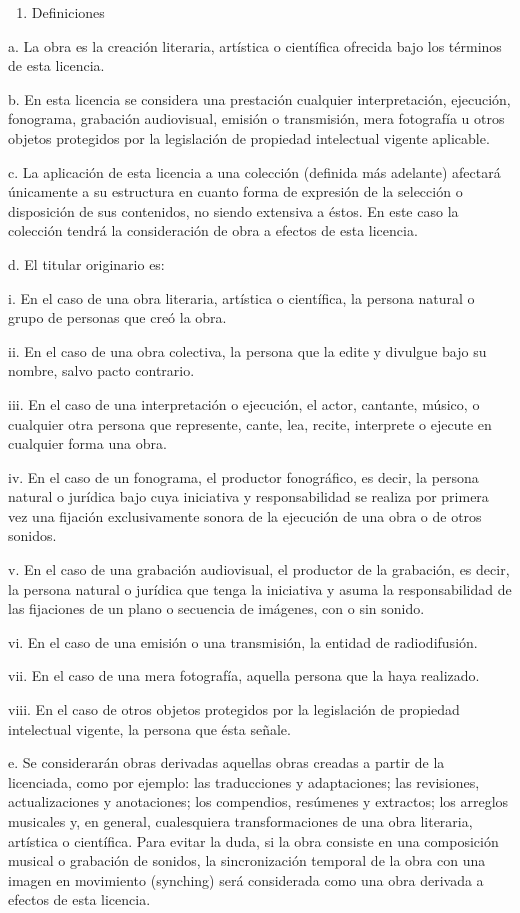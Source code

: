 \documentclass[11pt]{article}
\begin{document}
{{\begin{enumerate}
\item Definiciones
\end{enumerate}
a. La obra es la creación literaria, artística o científica ofrecida bajo los términos de esta licencia. 

b. En esta licencia se considera una prestación cualquier interpretación, ejecución, fonograma, grabación audiovisual, emisión o transmisión, mera fotografía u otros objetos protegidos por la legislación de propiedad intelectual vigente aplicable. 

c. La aplicación de esta licencia a una colección (definida más adelante) afectará únicamente a su estructura en cuanto forma de expresión de la selección o disposición de sus contenidos, no siendo extensiva a éstos. En este caso la colección tendrá la consideración de obra a efectos de esta licencia. 

d. El titular originario es: 

i. En el caso de una obra literaria, artística o científica, la persona natural o grupo de personas que creó la obra. 

ii. En el caso de una obra colectiva, la persona que la edite y divulgue bajo su nombre, salvo pacto contrario. 

iii. En el caso de una interpretación o ejecución, el actor, cantante, músico, o cualquier otra persona que represente, cante, lea, recite, interprete o ejecute en cualquier forma una obra. 

iv. En el caso de un fonograma, el productor fonográfico, es decir, la persona natural o jurídica bajo cuya iniciativa y responsabilidad se realiza por primera vez una fijación exclusivamente sonora de la ejecución de una obra o de otros sonidos. 

v. En el caso de una grabación audiovisual, el productor de la grabación, es decir, la persona natural o jurídica que tenga la iniciativa y asuma la responsabilidad de las fijaciones de un plano o secuencia de imágenes, con o sin sonido. 

vi. En el caso de una emisión o una transmisión, la entidad de radiodifusión. 

vii. En el caso de una mera fotografía, aquella persona que la haya realizado. 

viii. En el caso de otros objetos protegidos por la legislación de propiedad intelectual vigente, la persona que ésta señale. 

e. Se considerarán obras derivadas aquellas obras creadas a partir de la licenciada, como por ejemplo: las traducciones y adaptaciones; las revisiones, actualizaciones y anotaciones; los compendios, resúmenes y extractos; los arreglos musicales y, en general, cualesquiera transformaciones de una obra literaria, artística o científica. Para evitar la duda, si la obra consiste en una composición musical o grabación de sonidos, la sincronización temporal de la obra con una imagen en movimiento (synching) será considerada como una obra derivada a efectos de esta licencia. 

}}
\end{document}
